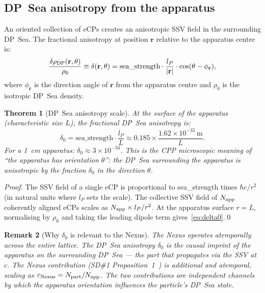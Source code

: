 \documentclass[11pt,a4paper]{article}
\newtheorem{theorem}{Theorem}[section]
\newtheorem{remark}[theorem]{Remark}
\newcommand{\lP}{l_P}
\newcommand{\eps}{\varepsilon}
\begin{document}
\subsection{DP~Sea anisotropy from the apparatus}

An oriented collection of eCPs creates an anisotropic SSV field
in the surrounding DP~Sea.  The fractional anisotropy at position
$\mathbf{r}$ relative to the apparatus centre is:
\begin{equation}
\frac{\delta\rho_{\rm DP}(\mathbf{r},\theta)}{\rho_0}
\equiv \delta(\mathbf{r},\theta)
= \text{sea\_strength} \cdot \frac{\lP}{|\mathbf{r}|}
  \cdot \cos(\theta - \phi_{\mathbf{r}}),
\label{eq:dp_anisotropy}
\end{equation}
where $\phi_{\mathbf{r}}$ is the direction angle of $\mathbf{r}$
from the apparatus centre and $\rho_0$ is the isotropic DP~Sea
density.

\begin{theorem}[DP~Sea anisotropy scale]
\label{thm:anisotropy}
At the surface of the apparatus (characteristic size $L$), the
fractional DP~Sea anisotropy is:
\begin{equation}
\delta_0 = \text{sea\_strength} \cdot \frac{\lP}{L}
\approx 0.185 \times \frac{1.62\times10^{-35}\,\text{m}}{L}.
\label{eq:delta0}
\end{equation}
For a 1~cm apparatus: $\delta_0 \approx 3 \times 10^{-34}$.
This is the CPP microscopic meaning of ``the apparatus has
orientation $\theta$'': the DP~Sea surrounding the apparatus
is anisotropic by the fraction $\delta_0$ in the direction $\theta$.
\end{theorem}

\begin{proof}
The SSV field of a single eCP is proportional to sea\_strength
times $\hbar c / r^2$ (in natural units where $\lP$ sets the
scale).  The collective SSV field of $N_{\rm app}$ coherently
aligned eCPs scales as $N_{\rm app} \times \lP/r^2$.
At the apparatus surface $r = L$, normalising by $\rho_0$ and
taking the leading dipole term gives~\eqref{eq:delta0}.\qed
\end{proof}

\begin{remark}[Why $\delta_0$ is relevant to the Nexus]
The Nexus operates atemporally across the entire lattice.  The
DP~Sea anisotropy $\delta_0$ is the \emph{causal} imprint of the
apparatus on the surrounding DP~Sea --- the part that propagates
via the SSV at $c$.  The Nexus contribution (SD\#1
Proposition~1~\citep{cpp_sd1}) is additional and atemporal,
scaling as $\eps_{\rm Nexus} = N_{\rm part}/N_{\rm app}$.  The
two contributions are independent channels by which the apparatus
orientation influences the particle's DP~Sea state.
\end{remark}
\end{document}
